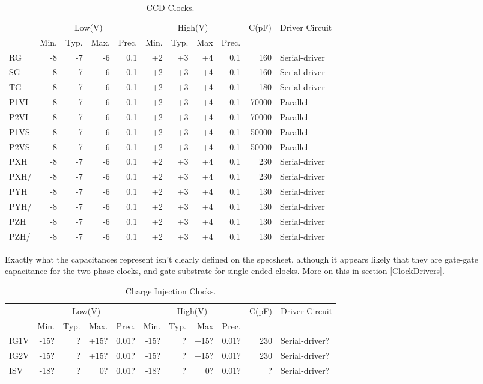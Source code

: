 \documentclass[a4paper,12pt]{article}
\begin{document}
\begin{table}[h]
\centering
\begin{tabular}{|l|rrrr|rrrr|r|l|}
\hline
&\multicolumn{4}{c|}{Low(V)}&\multicolumn{4}{c|}{High(V)}& C(pF)& Driver Circuit \\ 
&Min.&Typ.&Max.&Prec.&Min.&Typ.&Max&Prec.&& \\
\hline
RG & -8 & -7 & -6 & 0.1 & +2 & +3 & +4 & 0.1 & 160 & Serial-driver \\
SG & -8 & -7 & -6 & 0.1 & +2 & +3 & +4 & 0.1 & 160 & Serial-driver \\
TG & -8 & -7 & -6 & 0.1 & +2 & +3 & +4 & 0.1 & 180 & Serial-driver \\
P1VI & -8 & -7 & -6 & 0.1 & +2 & +3 & +4 & 0.1 & 70000 & Parallel \\
P2VI & -8 & -7 & -6 & 0.1 & +2 & +3 & +4 & 0.1 & 70000 & Parallel \\
P1VS & -8 & -7 & -6 & 0.1 & +2 & +3 & +4 & 0.1 & 50000 & Parallel \\
P2VS & -8 & -7 & -6 & 0.1 & +2 & +3 & +4 & 0.1 & 50000 & Parallel \\
PXH & -8 & -7 & -6 & 0.1 & +2 & +3 & +4 & 0.1 & 230 & Serial-driver \\
PXH/ & -8 & -7 & -6 & 0.1 & +2 & +3 & +4 & 0.1 & 230 & Serial-driver \\
PYH & -8 & -7 & -6 & 0.1 & +2 & +3 & +4 & 0.1 & 130 & Serial-driver \\
PYH/ & -8 & -7 & -6 & 0.1 & +2 & +3 & +4 & 0.1 & 130 & Serial-driver \\
PZH & -8 & -7 & -6 & 0.1 & +2 & +3 & +4 & 0.1 & 130 & Serial-driver \\
PZH/ & -8 & -7 & -6 & 0.1 & +2 & +3 & +4 & 0.1 & 130 & Serial-driver \\
\hline
\end{tabular}
 \caption{CCD Clocks.}
 \label{Clocks}
\end{table}

Exactly what the capacitances represent isn't clearly defined on the specsheet, although it appears likely that they are gate-gate capacitance for the two phase clocks, and gate-substrate for single ended clocks. More on this in section \ref{ClockDrivers}.

\begin{table}[h]
\centering
\begin{tabular}{|l|rrrr|rrrr|r|l|}
\hline
&\multicolumn{4}{c|}{Low(V)}&\multicolumn{4}{c|}{High(V)}& C(pF)& Driver Circuit \\ 
&Min.&Typ.&Max.&Prec.&Min.&Typ.&Max&Prec.&& \\
\hline
IG1V & -15? & ? & +15? & 0.01? & -15? & ? & +15? & 0.01? & 230 & Serial-driver? \\
IG2V & -15? & ? & +15? & 0.01? & -15? & ? & +15? & 0.01? & 230 & Serial-driver? \\
ISV & -18? & ? & 0? & 0.01? & -18? & ? & 0? & 0.01? & ? & Serial-driver? \\
\hline
\end{tabular}
 \caption{Charge Injection Clocks.}
 \label{CIClocks}
\end{table}
\end{document}
